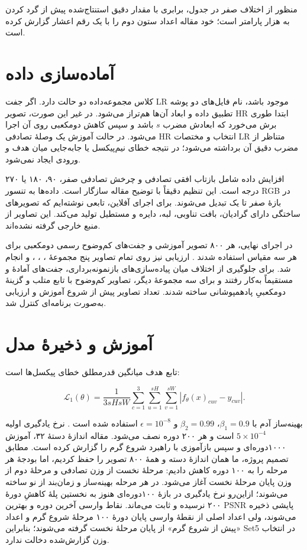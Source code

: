 منظور از اختلاف صفر در جدول، برابری با مقدار دقیق استنتاج‌شده پیش از گرد کردن به هزار پارامتر است؛ خود مقاله اعداد ستون دوم را با یک رقم اعشار گزارش کرده است.

\section{آماده‌سازی داده}

کلاس مجموعه‌داده دو حالت دارد. اگر جفت LR موجود باشد، نام فایل‌های دو پوشه تطبیق داده و ابعاد آن‌ها هم‌تراز می‌شود. در غیر این صورت، تصویر HR ابتدا طوری برش می‌خورد که ابعادش مضرب $s$ باشد و سپس کاهش دو‌مکعبی روی آن اجرا می‌شود. در حالت آموزش یک وصلهٔ تصادفی HR انتخاب و مختصات LR متناظر از مضرب دقیق آن برداشته می‌شود؛ در نتیجه خطای نیم‌پیکسل یا جابه‌جایی میان هدف و ورودی ایجاد نمی‌شود.

افزایش داده شامل بازتاب افقی تصادفی و چرخش تصادفی صفر، ۹۰، ۱۸۰ یا ۲۷۰ درجه است. این تنظیم دقیقاً با توضیح مقاله سازگار است. داده‌ها به تنسور RGB در بازهٔ صفر تا یک تبدیل می‌شوند. برای اجرای آفلاین، تابعی نوشته‌ایم که تصویرهای ساختگی دارای گرادیان، بافت تناوبی، لبه، دایره و مستطیل تولید می‌کند. این تصاویر از منبع خارجی گرفته نشده‌اند.

در اجرای نهایی، هر ۸۰۰ تصویر آموزشی  و جفت‌های کم‌وضوح رسمی دو‌مکعبی برای هر سه مقیاس استفاده شدند \cite{Agustsson2017}. ارزیابی نیز روی تمام تصاویر پنج مجموعهٔ ، ، ،  و  انجام شد. برای جلوگیری از اختلاف میان پیاده‌سازی‌های بازنمونه‌برداری، جفت‌های آمادهٔ  و  مستقیماً به‌کار رفتند و برای سه مجموعهٔ دیگر، تصاویر کم‌وضوح با تابع  متلب و گزینهٔ دو‌مکعبیِ پادهمپوشانی ساخته شدند. تعداد تصاویر پیش از شروع آموزش و ارزیابی به‌صورت برنامه‌ای کنترل شد.

\section{آموزش و ذخیرهٔ مدل}

تابع هدف میانگین قدرمطلق خطای پیکسل‌ها است:

\begin{equation}
\mathcal{L}_1(\theta)=\frac{1}{3sHsW}\sum_{c=1}^{3}\sum_{u=1}^{sH}\sum_{v=1}^{sW}
\left|f_{\theta}(x)_{cuv}-y_{cuv}\right|.
\end{equation}

بهینه‌ساز آدم با $\beta_1=0.9$، $\beta_2=0.99$ و $\epsilon=10^{-8}$ استفاده شده است \cite{Kingma2014}. نرخ یادگیری اولیه $5\times10^{-4}$ است و هر ۲۰۰ دوره نصف می‌شود. مقاله اندازهٔ دستهٔ ۳۲، آموزش ۱۰۰۰‌دوره‌ای و سپس بازآموزی با راهبرد شروع گرم را گزارش کرده است. مطابق تصمیم پروژه، ما همان اندازهٔ دسته و همهٔ ۸۰۰ تصویر را حفظ کردیم، اما بودجهٔ هر مرحله را به ۱۰۰ دوره کاهش دادیم: مرحلهٔ نخست از وزن تصادفی و مرحلهٔ دوم از وزن پایان مرحلهٔ نخست آغاز می‌شود. در هر مرحله بهینه‌ساز و زمان‌بند از نو ساخته می‌شوند؛ ازاین‌رو نرخ یادگیری در بازهٔ ۱۰۰‌دوره‌ای هنوز به نخستین پلهٔ کاهشِ دورهٔ ۲۰۰ نرسیده و ثابت می‌ماند. نقاط وارسی آخرین دوره و بهترین PSNR پایشی ذخیره می‌شوند، ولی اعداد اصلی از نقطهٔ وارسی پایان دورهٔ ۱۰۰ مرحلهٔ شروع گرم و اعداد «پیش از شروع گرم» از پایان مرحلهٔ نخست گرفته می‌شوند؛ بنابراین Set5 در انتخاب وزن گزارش‌شده دخالت ندارد.

